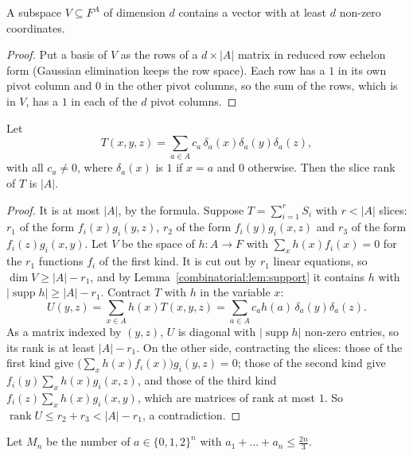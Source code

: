 \begin{lemma}\label{combinatorial:lem:support}
A subspace $V\subseteq F^A$ of dimension $d$ contains a vector with at least $d$ non-zero coordinates.
\end{lemma}
\begin{proof}
Put a basis of $V$ as the rows of a $d\times|A|$ matrix in reduced row echelon form (Gaussian elimination keeps the row space). Each row has a $1$ in its own pivot column and $0$ in the other pivot
columns, so the sum of the rows, which is in $V$, has a $1$ in each of the $d$ pivot columns.
\end{proof}

\begin{lemma}[Tao, 2016]\label{combinatorial:lem:diag}
Let
\[
T(x,y,z)=\sum_{a\in A}c_a\,\delta_a(x)\delta_a(y)\delta_a(z),
\]
with all $c_a\ne0$, where $\delta_a(x)$ is $1$ if $x=a$ and $0$ otherwise. Then the slice rank of $T$ is $|A|$.
\end{lemma}
\begin{proof}
It is at most $|A|$, by the formula. Suppose $T=\sum_{i=1}^rS_i$ with $r<|A|$ slices: $r_1$ of the form $f_i(x)g_i(y,z)$, $r_2$ of the form $f_i(y)g_i(x,z)$ and $r_3$ of the form $f_i(z)g_i(x,y)$. Let $V$ be the space of
$h:A\to F$ with $\sum_xh(x)f_i(x)=0$ for the $r_1$ functions $f_i$ of the first kind. It is cut out by $r_1$ linear equations, so $\dim V\ge|A|-r_1$, and by Lemma~\ref{combinatorial:lem:support} it contains $h$ with
$|\operatorname{supp}h|\ge|A|-r_1$. Contract $T$ with $h$ in the variable $x$:
\[
U(y,z)=\sum_{x\in A}h(x)T(x,y,z)=\sum_{a\in A}c_ah(a)\,\delta_a(y)\delta_a(z).
\]
As a matrix indexed by $(y,z)$, $U$ is diagonal with $|\operatorname{supp}h|$ non-zero entries, so its rank is at least $|A|-r_1$. On the other side, contracting the slices: those of the first kind give
$\bigl(\sum_xh(x)f_i(x)\bigr)g_i(y,z)=0$; those of the second kind give $f_i(y)\sum_xh(x)g_i(x,z)$, and those of the third kind $f_i(z)\sum_xh(x)g_i(x,y)$, which are matrices of rank at most $1$. So
$\operatorname{rank}U\le r_2+r_3<|A|-r_1$, a contradiction.
\end{proof}

Let $M_n$ be the number of $a\in\{0,1,2\}^n$ with $a_1+\dots+a_n\le\frac{2n}3$.

